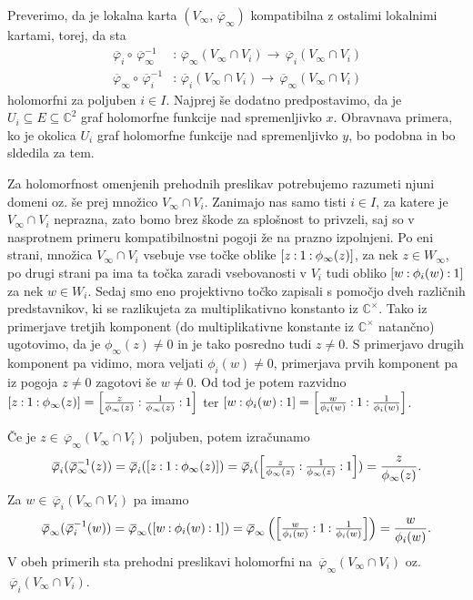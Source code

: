 \documentclass[mat1]{fmfdelo}
\newcommand{\C}{\mathbb C}
\newcommand{\CM}{\mathbb C ^\times}
\newcommand{\inv}{^{-1}}
\newcommand{\pcoor}[1]{%
\begingroup\lccode`~=`: \lowercase{\endgroup
\edef~}{\mathbin{\mathchar\the\mathcode`:}\nobreak}%
\left[%
\begingroup
\mathcode`:=\string"8000
#1%
\endgroup
\right]%
}
\newcommand{\olsi}[1]{\,\overline{\!{#1}}} %
\theoremstyle{definition}
\begin{document}
Preverimo, da je lokalna karta $(V_\infty, \olsi{\varphi}_\infty)$ kompatibilna z ostalimi lokalnimi kartami, torej, da sta
\begin{align*}
    \olsi{\varphi}_i \circ \olsi{\varphi}_\infty\inv &: \olsi{\varphi}_\infty(V_\infty \cap V_i) \to \olsi{\varphi}_i(V_\infty \cap V_i) \\
    \olsi{\varphi}_\infty \circ \olsi{\varphi}_i\inv &: \olsi{\varphi}_i(V_\infty \cap V_i) \to \olsi{\varphi}_\infty(V_\infty \cap V_i)
\end{align*}
holomorfni za poljuben $i \in I$. Najprej še dodatno predpostavimo, da je $U_i \subseteq E \subseteq \C^2$ graf holomorfne funkcije nad spremenljivko $x$. Obravnava primera, ko je okolica $U_i$ graf holomorfne funkcije nad spremenljivko $y$, bo podobna in bo sldedila za tem.

Za holomorfnost omenjenih prehodnih preslikav potrebujemo razumeti njuni domeni oz. še prej množico $V_\infty \cap V_i$. Zanimajo nas samo tisti $i \in I$, za katere je $V_\infty \cap V_i$ neprazna, zato bomo brez škode za splošnost to privzeli, saj so v nasprotnem primeru kompatibilnostni pogoji že na prazno izpolnjeni. Po eni strani, množica $V_\infty \cap V_i$ vsebuje vse točke oblike $\pcoor{z : 1 : \phi_\infty(z)}$, za nek $z \in W_\infty$, po drugi strani pa ima ta točka zaradi vsebovanosti v $V_i$ tudi obliko $\pcoor{w : \phi_i(w) : 1}$ za nek $w \in W_i$. Sedaj smo eno projektivno točko zapisali s pomočjo dveh različnih predstavnikov, ki se razlikujeta za multiplikativno konstanto iz $\CM$. Tako iz primerjave tretjih komponent (do multiplikativne konstante iz $\CM$ natančno) ugotovimo, da je $\phi_\infty(z) \neq 0$ in je tako posredno tudi $z \neq 0$. S primerjavo drugih komponent pa vidimo, mora veljati $\phi_i(w) \neq 0$, primerjava prvih komponent pa iz pogoja $z \neq 0$ zagotovi še $w \neq 0$. Od tod je potem razvidno $\pcoor{z : 1 : \phi_\infty(z)} = \pcoor{\tfrac{z}{\phi_\infty(z)} : \tfrac{1}{\phi_\infty(z)} : 1}$ ter $\pcoor{w : \phi_i(w) : 1} = \pcoor{\tfrac{w}{\phi_i(w)} : 1 : \tfrac{1}{\phi_i(w)}}$. 

Če je $z \in \olsi{\varphi}_\infty(V_\infty \cap V_i)$ poljuben, potem izračunamo 
\[
    \olsi{\varphi}_i (\olsi{\varphi}_\infty\inv (z)) = 
    \olsi{\varphi}_i (\pcoor{z : 1 : \phi_\infty(z)}) = 
    \olsi{\varphi}_i (\pcoor{\tfrac{z}{\phi_\infty(z)} : \tfrac{1}{\phi_\infty(z)} : 1}) = 
    \frac{z}{\phi_\infty(z)}.
\]
Za $w \in \olsi{\varphi}_i(V_\infty \cap V_i)$ pa imamo
\[
    \olsi{\varphi}_\infty (\olsi{\varphi}_i\inv(w)) =
    \olsi{\varphi}_\infty (\pcoor{w : \phi_i(w) : 1}) =
    \olsi{\varphi}_\infty \left(\pcoor{\tfrac{w}{\phi_i(w)} : 1 : \tfrac{1}{\phi_i(w)}}\right) =
    \frac{w}{\phi_i(w)}.
\]
V obeh primerih sta prehodni preslikavi holomorfni na $\olsi{\varphi}_\infty(V_\infty \cap V_i)$ oz. $\olsi{\varphi}_i(V_\infty \cap V_i)$.
\end{document}
